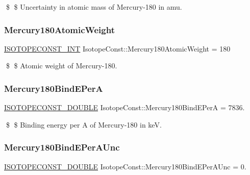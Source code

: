 \$ \$ Uncertainty in atomic mass of Mercury-\/180 in amu. \mbox{\label{group___isotope_const-_mercury-_hg180_gaed14fb2f112e8ce7109ca82c2150521d}} 
\subsubsection{\texorpdfstring{Mercury180\+Atomic\+Weight}{Mercury180AtomicWeight}}
{\footnotesize\ttfamily \mbox{\hyperlink{group___isotope_const-_macros_ga5f18360b3e99483a35c32d789e62621c}{I\+S\+O\+T\+O\+P\+E\+C\+O\+N\+S\+T\+\_\+\+I\+NT}} Isotope\+Const\+::\+Mercury180\+Atomic\+Weight = 180}

\$ \$ Atomic weight of Mercury-\/180. \mbox{\label{group___isotope_const-_mercury-_hg180_ga0467f63722fbd0bb6f6adb87f97e7c34}} 
\subsubsection{\texorpdfstring{Mercury180\+Bind\+E\+PerA}{Mercury180BindEPerA}}
{\footnotesize\ttfamily \mbox{\hyperlink{group___isotope_const-_macros_ga8f45a7272ce02c0b4c65c44636ed719a}{I\+S\+O\+T\+O\+P\+E\+C\+O\+N\+S\+T\+\_\+\+D\+O\+U\+B\+LE}} Isotope\+Const\+::\+Mercury180\+Bind\+E\+PerA = 7836.}

\$ \$ Binding energy per A of Mercury-\/180 in keV. \mbox{\label{group___isotope_const-_mercury-_hg180_ga8a80fb5ec1ae3108299640d3dacb8f34}} 
\subsubsection{\texorpdfstring{Mercury180\+Bind\+E\+Per\+A\+Unc}{Mercury180BindEPerAUnc}}
{\footnotesize\ttfamily \mbox{\hyperlink{group___isotope_const-_macros_ga8f45a7272ce02c0b4c65c44636ed719a}{I\+S\+O\+T\+O\+P\+E\+C\+O\+N\+S\+T\+\_\+\+D\+O\+U\+B\+LE}} Isotope\+Const\+::\+Mercury180\+Bind\+E\+Per\+A\+Unc = 0.}

